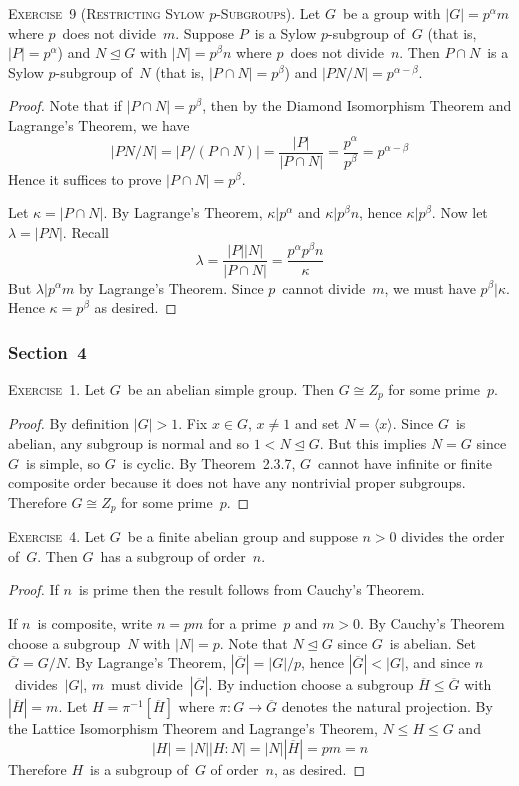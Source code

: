 \documentclass[letterpaper]{article}
\newcommand{\exercise}[1]{\goodbreak\noindent\textsc{Exercise~{#1}.}}
\newcommand{\iso}{\cong}
\newcommand{\sect}{\cap}
\newcommand{\subgroup}{\le}
\newcommand{\normal}{\trianglelefteq}
\newcommand{\res}[1]{\overline{#1}}
\newcommand{\ord}[1]{|{#1}|}
\newcommand{\gen}[1]{\langle{#1}\rangle}
\newcommand{\gindex}[2]{|{#1}:{#2}|}
\begin{document}
\bigskip
\exercise{9 (Restricting Sylow $p$-Subgroups)}
Let $G$~be a group with $\ord{G}=p^{\alpha}m$ where $p$~does not divide~$m$. Suppose $P$~is a Sylow $p$-subgroup of~$G$ (that is, $\ord{P}=p^{\alpha}$) and $N\normal G$ with $\ord{N}=p^{\beta}n$ where $p$~does not divide~$n$. Then $P\sect N$~is a Sylow $p$-subgroup of~$N$ (that is, $\ord{P\sect N}=p^{\beta}$) and $\ord{PN/N}=p^{\alpha-\beta}$.
\begin{proof}
Note that if $\ord{P\sect N}=p^{\beta}$, then by the Diamond Isomorphism Theorem and Lagrange's Theorem, we have
$$\ord{PN/N}=\ord{P/(P\sect N)}=\frac{\ord{P}}{\ord{P\sect N}}=\frac{p^{\alpha}}{p^{\beta}}=p^{\alpha-\beta}$$
Hence it suffices to prove $\ord{P\sect N}=p^{\beta}$.

Let $\kappa=\ord{P\sect N}$. By Lagrange's Theorem, $\kappa|p^{\alpha}$ and $\kappa|p^{\beta}n$, hence $\kappa|p^{\beta}$. Now let $\lambda=\ord{PN}$. Recall
$$\lambda=\frac{\ord{P}\ord{N}}{\ord{P\sect N}}=\frac{p^{\alpha}p^{\beta}n}{\kappa}$$
But $\lambda|p^{\alpha}m$ by Lagrange's Theorem. Since $p$~cannot divide~$m$, we must have $p^{\beta}|\kappa$. Hence $\kappa=p^{\beta}$ as desired.
\end{proof}

\subsubsection*{Section~4}
\exercise{1}
Let $G$~be an abelian simple group. Then $G\iso Z_p$ for some prime~$p$.
\begin{proof}
By definition $\ord{G}>1$. Fix $x\in G$, $x\ne1$ and set $N=\gen{x}$. Since $G$~is abelian, any subgroup is normal and so $1<N\normal G$. But this implies $N=G$ since $G$~is simple, so $G$~is cyclic. By Theorem~2.3.7, $G$~cannot have infinite or finite composite order because it does not have any nontrivial proper subgroups. Therefore $G\iso Z_p$ for some prime~$p$.
\end{proof}

\exercise{4}
Let $G$~be a finite abelian group and suppose $n>0$ divides the order of~$G$. Then $G$~has a subgroup of order~$n$.
\begin{proof}
If $n$~is prime then the result follows from Cauchy's Theorem.

If $n$~is composite, write $n=pm$ for a prime~$p$ and $m>0$. By Cauchy's Theorem choose a subgroup~$N$ with $\ord{N}=p$. Note that $N\normal G$ since $G$~is abelian. Set $\res{G}=G/N$. By Lagrange's Theorem, $\ord{\res{G}}=\ord{G}/p$, hence $\ord{\res{G}}<\ord{G}$, and since $n$~divides~$\ord{G}$, $m$~must divide~$\ord{\res{G}}$. By induction choose a subgroup $\res{H}\subgroup\res{G}$ with $\ord{\res{H}}=m$. Let $H=\pi^{-1}[\res{H}]$ where $\pi:G\to\res{G}$ denotes the natural projection. By the Lattice Isomorphism Theorem and Lagrange's Theorem, $N\subgroup H\subgroup G$ and
$$\ord{H}=\ord{N}\gindex{H}{N}=\ord{N}\ord{\res{H}}=pm=n$$
Therefore $H$~is a subgroup of~$G$ of order~$n$, as desired.
\end{proof}
\end{document}
